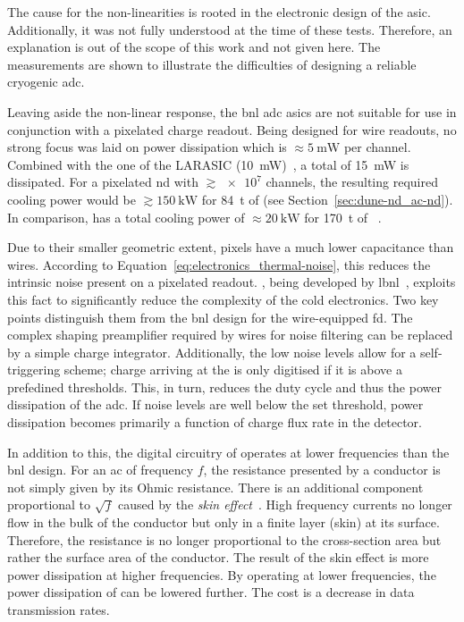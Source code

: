 The cause for the non-linearities is rooted in the electronic design of the \gls{asic}.
Additionally, it was not fully understood at the time of these tests.
Therefore, an explanation is out of the scope of this work and not given here.
The measurements are shown to illustrate the difficulties of designing a reliable cryogenic \gls{adc}.

Leaving aside the non-linear response, the \gls{bnl} \gls{adc} \glspl{asic} are not suitable for use in conjunction with a pixelated \lartpc{} charge readout.
Being designed for wire readouts, no strong focus was laid on power dissipation which is $\approx \SI{5}{\milli\watt}$ per channel.
Combined with the one of the LARASIC (\SI{10}{\milli\watt})~\cite{larasic}, a total of \SI{15}{\milli\watt} is dissipated.
For a pixelated \dune{} \gls{nd} with $\gtrsim {\num{e7}}$ channels, the resulting required cooling power would be $\gtrsim \SI{150}{\kilo\watt}$ for \SI{84}{\tonne} of \lar{} (see Section~\ref{sec:dune-nd_ac-nd}).
In comparison, \uboone{} has a total cooling power of $\approx \SI{20}{\kilo\watt}$ for \SI{170}{\tonne} of \lar{}~\cite{uboone}.

Due to their smaller geometric extent, pixels have a much lower capacitance than wires.
According to Equation~\eqref{eq:electronics_thermal-noise}, this reduces the intrinsic noise present on a pixelated readout.
\larpix{}, being developed by \gls{lbnl}~\cite{larpix}, exploits this fact to significantly reduce the complexity of the cold electronics.
Two key points distinguish them from the \gls{bnl} design for the wire-equipped \gls{fd}.
The complex shaping preamplifier required by wires for noise filtering can be replaced by a simple charge integrator.
Additionally, the low noise levels allow for a self-triggering scheme; charge arriving at the \larpix{} is only digitised if it is above a prefedined thresholds.
This, in turn, reduces the duty cycle and thus the power dissipation of the \gls{adc}.
If noise levels are well below the set threshold, power dissipation becomes primarily a function of charge flux rate in the detector.

In addition to this, the digital circuitry of \larpix{} operates at lower frequencies than the \gls{bnl} design.
For an \gls{ac} of frequency $f$, the resistance presented by a conductor is not simply given by its Ohmic resistance.
There is an additional component proportional to $\sqrt{f}$ caused by the \emph{skin effect}~\cite{horowitzHill}.
High frequency currents no longer flow in the bulk of the conductor but only in a finite layer (skin) at its surface.
Therefore, the resistance is no longer proportional to the cross-section area but rather the surface area of the conductor.
The result of the skin effect is more power dissipation at higher frequencies.
By operating at lower frequencies, the power dissipation of \larpix{} can be lowered further.
The cost is a decrease in data transmission rates.

